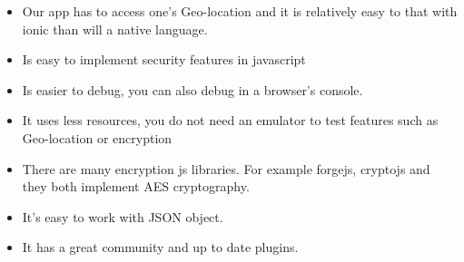 \documentclass[a4paper,12pt]{article}
\begin{document}
\begin{itemize}
\begin{itemize}
\item Our app has to access one’s Geo-location and it is relatively easy to that with ionic than will a native language.
\item Is easy to implement security features in javascript
\item Is easier to debug, you can also debug in a browser’s console.
\item It uses less resources, you do not need an emulator to test features such as Geo-location or encryption
\item There are many encryption js libraries. For example forgejs, cryptojs and they both implement AES cryptography.
\item It's easy to work with JSON object.
\item It has a great community and up to date plugins.
	\end{itemize}
\end{itemize}
\end{document}
